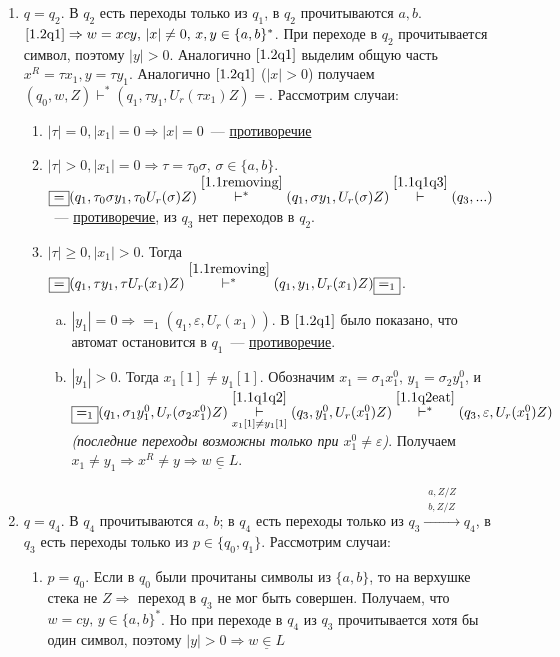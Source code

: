\documentclass[a4paper]{article}
\begin{document}
\begin{enumerate}[1.]
\begin{enumerate}
\begin{enumerate}
\begin{enumerate}[a.]
\end{enumerate}
\end{enumerate}
\item \label{1.2q2} $q=q_2$. В $q_2$ есть переходы только из $q_1$, в $q_2$ прочитываются $a,b$. $\ref{1.2q1}\Rightarrow w=xcy,\,|x|\neq 0,\,x,y\in\{a,b\}^*$. При переходе в $q_2$ прочитывается символ, поэтому $|y|>0$. Аналогично $\ref{1.2q1}$ выделим общую часть $x^R=\tau x_1,y=\tau y_1$. Аналогично $\ref{1.2q1}$ ($|x|>0$) получаем $(q_0,w,Z)\vdash^*(q_1,\tau y_1,U_r(\tau x_1)Z)\boxed{=}$. Рассмотрим случаи:\begin{enumerate}
\item $|\tau|=0,|x_1|=0\Rightarrow|x|=0$~--- \underline{противоречие}
\item $|\tau|>0,|x_1|=0\Rightarrow\tau=\tau_0\sigma,\,\sigma\in\{a,b\}$. $\boxed{=}(q_1,\tau_0\sigma y_1,\tau_0 U_r(\sigma)Z)\overset{\ref{1.1removing}}{\vdash^*}(q_1,\sigma y_1,U_r(\sigma)Z)\overset{\ref{1.1q1q3}}{\vdash}(q_3,...)$~--- \underline{противоречие}, из $q_3$ нет переходов в $q_2$.
\item $|\tau|\geqslant 0,|x_1|>0$. Тогда $\boxed{=}(q_1,\tau y_1,\tau U_r(x_1)Z)\overset{\ref{1.1removing}}{\vdash^*}(q_1,y_1,U_r(x_1)Z)\boxed{=_1}$.\begin{enumerate}[a.]
\item $|y_1|=0\Rightarrow\boxed{=_1}(q_1,\varepsilon,U_r(x_1))$. В $\ref{1.2q1}$ было показано, что автомат остановится в $q_1$~--- \underline{противоречие}.
\item $|y_1|>0$. Тогда $x_1[1]\neq y_1[1]$. Обозначим $x_1=\sigma_1 x_1^0,\,y_1=\sigma_2 y^0_1$, и $\boxed{=_1}(q_1,\sigma_1 y^0_1,U_r(\sigma_2 x^0_1)Z)\underset{x_1[1]\neq y_1[1]}{\overset{\ref{1.1q1q2}}{\vdash}}\newline(q_3,y^0_1,U_r(x^0_1)Z)\overset{\ref{1.1q2eat}}{\vdash^*}(q_3,\varepsilon,U_r(x^0_1)Z)$ {\em (последние переходы возможны только при $x^0_1\neq\varepsilon$)}.\newline
Получаем $x_1\neq y_1\Rightarrow x^R\neq y\Rightarrow \underline{w\in L}$.
\end{enumerate}
\end{enumerate}
\item $q=q_4$. В $q_4$ прочитываются $a$, $b$; в $q_4$ есть переходы только из $q_3\overset{\substack{a,Z/Z\\b,Z/Z}}{\longrightarrow} q_4$, в $q_3$ есть переходы только из $p\in\{q_0,q_1\}$. Рассмотрим случаи:\begin{enumerate}
\item $p=q_0$. Если в $q_0$ были прочитаны символы из $\{a,b\}$, то на верхушке стека не $Z\Rightarrow$ переход в $q_3$ не мог быть совершен. Получаем, что $w=cy,\,y\in\{a,b\}^*$. Но при переходе в $q_4$ из $q_3$ прочитывается хотя бы один символ, поэтому $|y|>0\Rightarrow \underline{w\in L}$

\end{enumerate}
\end{enumerate}
\end{enumerate}
\end{document}

